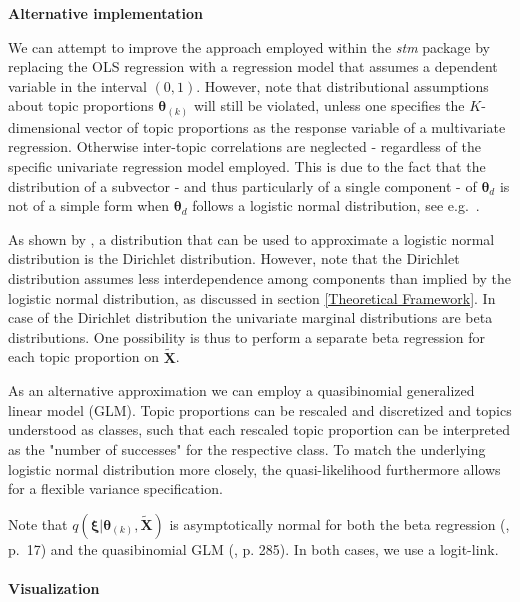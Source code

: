 \noindent \textbf{Alternative implementation} \vspace{10px}

\noindent We can attempt to improve the approach employed within the \textit{stm} package by replacing the OLS regression with a regression model that assumes a dependent variable in the interval $(0,1)$. However, note that distributional assumptions about topic proportions $\boldsymbol{\theta}_{(k)}$ will still be violated, unless one specifies the $K$-dimensional vector of topic proportions as the response variable of a multivariate regression. Otherwise inter-topic correlations are neglected - regardless of the specific univariate regression model employed. This is due to the fact that the distribution of a subvector - and thus particularly of a single component - of $\boldsymbol{\theta}_d$ is not of a simple form when $\boldsymbol{\theta}_d$ follows a logistic normal distribution, see e.g.\ \cite{atchison1980logistic}.

As shown by \cite{atchison1980logistic}, a distribution that can be used to approximate a logistic normal distribution is the Dirichlet distribution. However, note that the Dirichlet distribution assumes less interdependence among components than implied by the logistic normal distribution, as discussed in section \ref{Theoretical Framework}. In case of the Dirichlet distribution the univariate marginal distributions are beta distributions. One possibility is thus to perform a separate beta regression for each topic proportion on $\tilde{\boldsymbol{X}}$. 

As an alternative approximation we can employ a quasibinomial generalized linear model (GLM). Topic proportions can be rescaled and discretized and topics understood as classes, such that each rescaled topic proportion can be interpreted as the "number of successes" for the respective class. To match the underlying logistic normal distribution more closely, the quasi-likelihood furthermore allows for a flexible variance specification.

Note that $q(\boldsymbol{\xi}| \boldsymbol{\theta}_{(k)}, \tilde{\boldsymbol{X}})$ is asymptotically normal for both the beta regression (\citealp{ferrari2004beta}, p.\ 17) and the quasibinomial GLM (\citealp{fahrmeir2007regression}, p. 285). In both cases, we use a logit-link. \\
\\
\noindent \textbf{Visualization} \vspace{10px}

